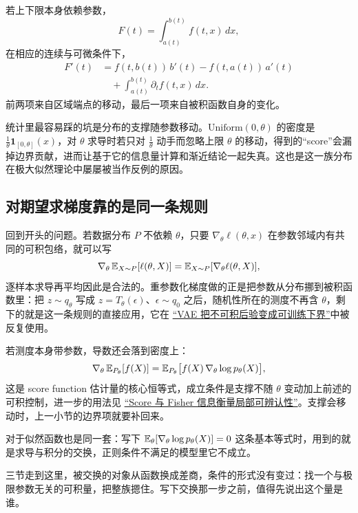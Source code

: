 若上下限本身依赖参数，
\[
F(t)=\int_{a(t)}^{b(t)}f(t,x)\,dx,
\]
在相应的连续与可微条件下，
\[
\begin{aligned}
F'(t)&=f(t,b(t))\,b'(t)-f(t,a(t))\,a'(t)\\
&\quad+\int_{a(t)}^{b(t)}\partial_t f(t,x)\,dx.
\end{aligned}
\]
前两项来自区域端点的移动，最后一项来自被积函数自身的变化。

统计里最容易踩的坑是分布的支撑随参数移动。\(\mathrm{Uniform}(0,\theta)\) 的密度是 \(\frac1\theta\mathbf1_{[0,\theta]}(x)\)，对 \(\theta\) 求导时若只对 \(\frac1\theta\) 动手而忽略上限 \(\theta\) 的移动，得到的``score''会漏掉边界贡献，进而让基于它的信息量计算和渐近结论一起失真。这也是这一族分布在极大似然理论中屡屡被当作反例的原因。

\subsection{对期望求梯度靠的是同一条规则}

回到开头的问题。若数据分布 \(P\) 不依赖 \(\theta\)，只要 \(\nabla_\theta\ell(\theta,x)\) 在参数邻域内有共同的可积包络，就可以写
\[
\nabla_\theta\,\mathbb{E}_{X\sim P}[\ell(\theta,X)]=\mathbb{E}_{X\sim P}[\nabla_\theta\ell(\theta,X)],
\]
逐样本求导再平均因此是合法的。重参数化梯度做的正是把参数从分布挪到被积函数里：把 \(z\sim q_\theta\) 写成 \(z=T_\theta(\epsilon)\)、\(\epsilon\sim q_0\) 之后，随机性所在的测度不再含 \(\theta\)，剩下的就是这一条规则的直接应用，它在 \hyperref[sec:14-Deep-Learning/06-Variational-Autoencoders/01]{``VAE 把不可积后验变成可训练下界''}中被反复使用。

若测度本身带参数，导数还会落到密度上：
\[
\nabla_\theta\,\mathbb{E}_{P_\theta}[f(X)]=\mathbb{E}_{P_\theta}\bigl[f(X)\,\nabla_\theta\log p_\theta(X)\bigr],
\]
这是 score function 估计量的核心恒等式，成立条件是支撑不随 \(\theta\) 变动加上前述的可积控制，进一步的用法见 \hyperref[sec:11-Mathematical-Statistics/03-Sufficient-Statistics-and-Information/02]{``Score 与 Fisher 信息衡量局部可辨认性''}。支撑会移动时，上一小节的边界项就要补回来。

对于似然函数也是同一套：写下 \(\mathbb{E}_\theta[\nabla_\theta\log p_\theta(X)]=0\) 这条基本等式时，用到的就是求导与积分的交换，正则条件不满足的模型里它不成立。

三节走到这里，被交换的对象从函数换成差商，条件的形式没有变过：找一个与极限参数无关的可积量，把整族摁住。写下交换那一步之前，值得先说出这个量是谁。

